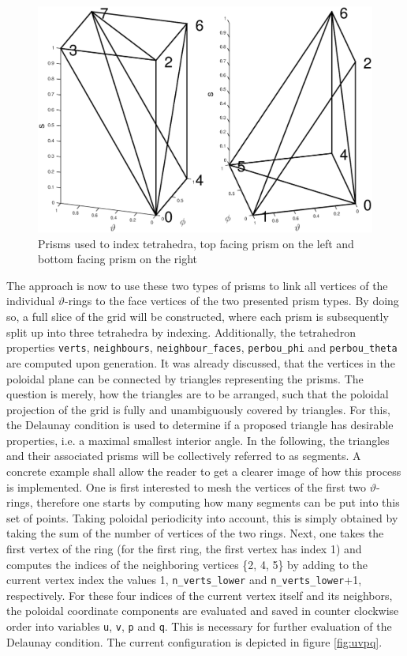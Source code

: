 \documentclass[./main.tex]{subfiles}
\begin{document}
\begin{figure}[!ht]
	\includegraphics[width=1\textwidth]{figures/2Prisms_comparison.eps}
	\caption{Prisms used to index tetrahedra, top facing prism on the left and bottom facing prism on the right}
	\label{fig:2prims_comp}
\end{figure}
 
The approach is now to use these two types of prisms to link all vertices of the individual $\vartheta$-rings to the face vertices of the two presented prism types. By doing so, a full slice of the grid will be constructed, where each prism is subsequently split up into three tetrahedra by indexing. Additionally, the tetrahedron properties \texttt{verts}, \texttt{neighbours}, \texttt{neighbour\_faces}, \texttt{perbou\_phi} and \texttt{perbou\_theta} are computed upon generation.
It was already discussed, that the vertices in the poloidal plane can be connected by triangles representing the prisms. The question is merely, how the triangles are to be arranged, such that the poloidal projection of the grid is fully and unambiguously covered by triangles. For this, the Delaunay condition is used to determine if a proposed triangle has desirable properties, i.e. a maximal smallest interior angle. In the following, the triangles and their associated prisms will be collectively referred to as segments. 
A concrete example shall allow the reader to get a clearer image of how this process is implemented.
One is first interested to mesh the vertices of the first two $\vartheta$-rings, therefore one starts by computing how many segments can be put into this set of points. Taking poloidal periodicity into account, this is simply obtained by taking the sum of the number of vertices of the two rings. Next, one takes the first vertex of the ring (for the first ring, the first vertex has index 1) and computes the indices of the neighboring vertices \{2, 4, 5\} by adding to the current vertex index the values 1, \texttt{n\_verts\_lower} and \texttt{n\_verts\_lower}+1, respectively. For these four indices of the current vertex itself and its neighbors, the poloidal coordinate components are evaluated and saved in counter clockwise order into variables \texttt{u}, \texttt{v}, \texttt{p} and \texttt{q}. This is necessary for further evaluation of the Delaunay condition.    
The current configuration is depicted in figure \ref{fig:uvpq}.
\end{document}
